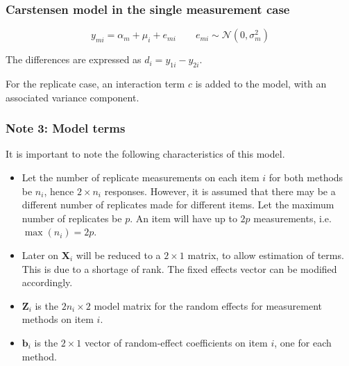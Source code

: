 \documentclass[compress]{beamer}        %
\begin{document}
\begin{frame}
\frametitle{Carstensen model in the single measurement case}

\begin{equation}
y_{mi}  = \alpha_{m} + \mu_{i} + e_{mi} \qquad  e_{mi} \sim \mathcal{N}(0,\sigma^{2}_{m})
\end{equation}

The differences are expressed as $d_{i} = y_{1i} - y_{2i}$.

For the replicate case, an interaction term $c$ is added to the model, with an associated variance component.
\end{frame}

\begin{frame}
\frametitle{Note 3: Model terms}
It is important to note the following characteristics of this model.
\begin{itemize}
\item Let the number of replicate measurements on each item $i$ for both methods be $n_i$, hence $2 \times n_i$ responses. However, it is assumed that there may be a different number of replicates made for different items. Let the maximum number of replicates be $p$. An item will have up to $2p$ measurements, i.e. $\max(n_{i}) = 2p$.


\item Later on $\boldsymbol{X}_i$ will be reduced to a $2 \times 1$ matrix, to allow estimation of terms. This is due to a shortage of rank. The fixed effects vector can be modified accordingly.
\item $\boldsymbol{Z}_i$ is the $2n_i \times  2$ model matrix for the random effects for measurement methods on item $i$.
\item $\boldsymbol{b}_i$ is the $2 \times  1$ vector of random-effect coefficients on item $i$, one for each method.
\end{itemize}
\end{frame}
\end{document}
